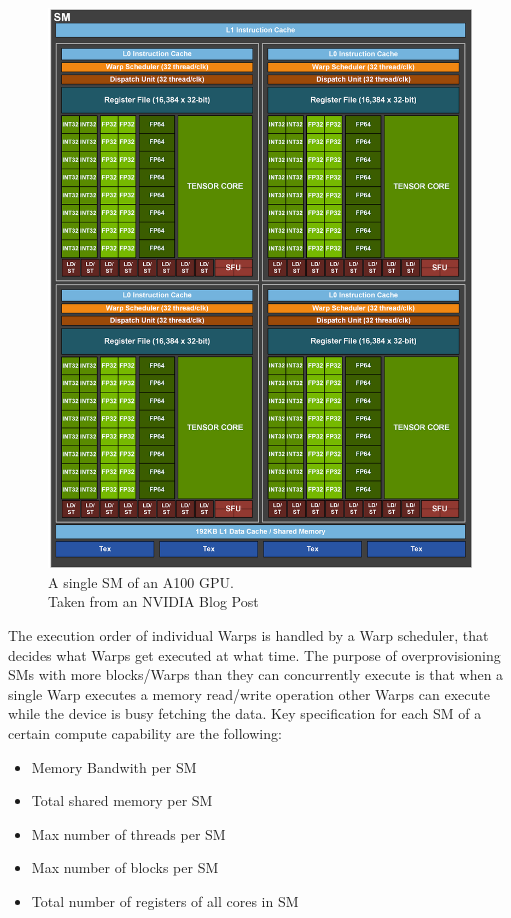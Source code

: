\begin{figure}
    \centering
    \includegraphics[width=.7\textwidth]{img/a100.png}
    \caption[Diagram of a single A100 SM]{A single SM of an A100 GPU.\\Taken from an NVIDIA Blog Post\footnotemark}
    \label{fig:cuda-sm}
\end{figure}
The execution order of individual Warps is handled by a Warp scheduler, that decides what Warps get executed at what time.
The purpose of overprovisioning SMs with more blocks/Warps than they can concurrently execute is that when a single Warp executes a memory read/write operation other Warps can execute while the device is busy fetching the data.
Key specification for each SM of a certain compute capability are the following:
\begin{itemize}
    \item Memory Bandwith per SM
    \item Total shared memory per SM
    \item Max number of threads per SM
    \item Max number of blocks per SM
    \item Total number of registers of all cores in SM
\end{itemize}

